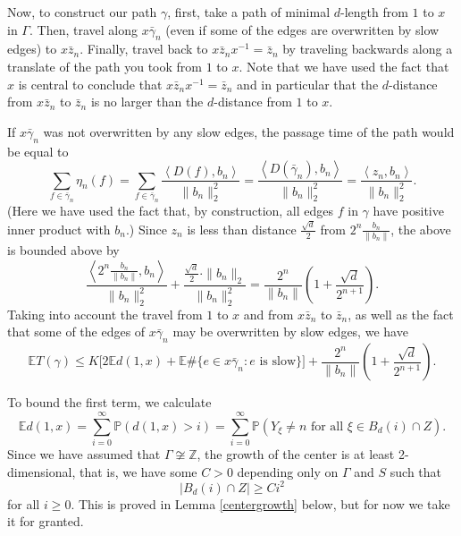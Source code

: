 \documentclass[12pt,reqno]{article}
\numberwithin{equation}{section}
\newcommand{\E}{\mathbb{E}}
\newcommand{\Prob}{\mathbb{P}}
\newcommand{\Z}{\mathbb{Z}}
\newcommand{\pair}[2]{\left\langle #1, #2 \right\rangle}
\begin{document}
Now, to construct our path $\gamma$, first, take a path of minimal $d$-length from $1$ to $x$ in $\Gamma$.
Then, travel along $x \bar{\gamma}_n$ (even if some of the edges are overwritten by slow edges) to $x \bar{z}_n$. Finally, travel back to
$x \bar{z}_n x^{-1} = \bar{z}_n$ by traveling backwards along a translate of the path you took from $1$ to $x$. Note that we have used
the fact that $x$ is central to conclude that $x \bar{z}_n x^{-1} = \bar{z}_n$ and in particular that the $d$-distance from $x \bar{z}_n$
to $\bar{z}_n$ is no larger than the $d$-distance from $1$ to $x$.

If $x \bar{\gamma}_n$ was not overwritten by any slow edges, the passage time of the path would be equal to
\[ 
   \sum_{f \in \bar{\gamma}_n} \eta_n(f) = \sum_{f \in \bar{\gamma}_n} \frac{ \pair{D(f)}{ b_n } }{ \|b_n\|_2^2 } 
   = \frac{ \pair{D(\bar{\gamma}_n)}{b_n} }{\|b_n\|_2^2} = \frac{ \pair{z_n}{b_n} }{\|b_n\|_2^2}.
\]
(Here we have used the fact that, by construction, all edges $f$ in $\gamma$ have positive inner product with $b_n$.)
Since $z_n$ is less than distance $\frac{\sqrt{d}}{2}$ from $2^n \frac{b_n}{\|b_n\|}$, the above is bounded above by
\[ 
   \frac{ \pair{2^n \frac{b_n}{\|b_n\|} }{b_n} }{ \|b_n\|_2^2 } + \frac{ \frac{\sqrt{d}}{2} \cdot \| b_n\|_2 }{\|b_n\|_2^2}
   = \frac{ 2^n }{ \|b_n\| } \left(1 + \frac{ \sqrt{d} }{ 2^{n+1} } \right). 
\]
Taking into account the travel from $1$ to $x$ and from $x \bar{z}_n$ to $\bar{z}_n$, as well as the fact that some of the edges
of $x \bar{\gamma}_n$ may be overwritten by slow edges, we have
\begin{equation}
\label{eqn:pathlengthbound}
   \E T(\gamma) \le K \big[ 2 \E d(1,x) + \E \# \{ e \in x \bar{\gamma}_n : e \mbox{ is slow} \} \big]
   + \frac{ 2^n }{ \|b_n\| } \left(1 + \frac{ \sqrt{d} }{ 2^{n+1} } \right).
\end{equation}

To bound the first term, we calculate
\[ 
   \E d(1,x) = \sum_{i=0}^{\infty} \Prob( d(1,x) > i ) = \sum_{i=0}^{\infty} \Prob( Y_{\xi} \ne n \mbox{ for all } \xi \in B_{d}(i) \cap Z ). 
\]
Since we have assumed that $\Gamma \not\cong \Z$, the growth of the center is at least
2-dimensional, that is, we have some
$C > 0$ depending only on $\Gamma$ and $S$ such that
\[ 
   |B_{d}(i) \cap Z| \ge Ci^2 
\]
for all $i \ge 0$. This is proved in Lemma \ref{centergrowth} below, but for now we take it for granted.
\end{document}
